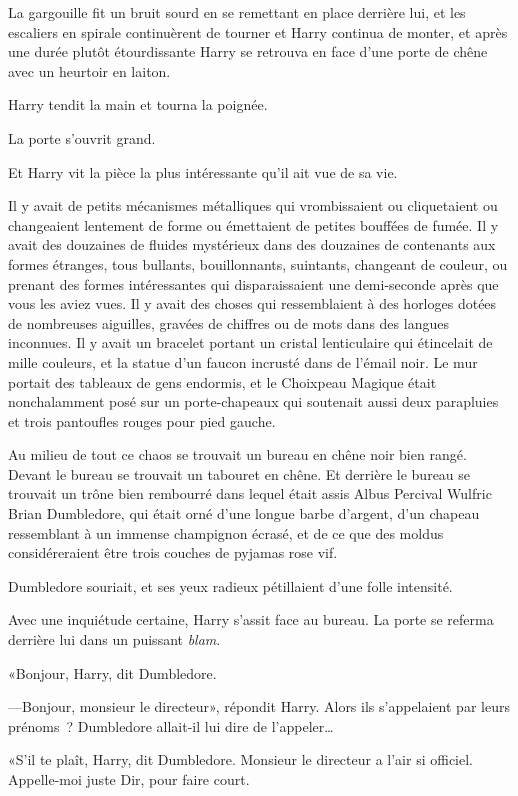 La gargouille fit un bruit sourd en se remettant en place derrière lui, et les escaliers en spirale continuèrent de tourner et Harry continua de monter, et après une durée plutôt étourdissante Harry se retrouva en face d'une porte de chêne avec un heurtoir en laiton.

Harry tendit la main et tourna la poignée.

La porte s'ouvrit grand.

Et Harry vit la pièce la plus intéressante qu'il ait vue de sa vie.

Il y avait de petits mécanismes métalliques qui vrombissaient ou cliquetaient ou changeaient lentement de forme ou émettaient de petites bouffées de fumée. Il y avait des douzaines de fluides mystérieux dans des douzaines de contenants aux formes étranges, tous bullants, bouillonnants, suintants, changeant de couleur, ou prenant des formes intéressantes qui disparaissaient une demi-seconde après que vous les aviez vues. Il y avait des choses qui ressemblaient à des horloges dotées de nombreuses aiguilles, gravées de chiffres ou de mots dans des langues inconnues. Il y avait un bracelet portant un cristal lenticulaire qui étincelait de mille couleurs, et la statue d'un faucon incrusté dans de l'émail noir. Le mur portait des tableaux de gens endormis, et le Choixpeau Magique était nonchalamment posé sur un porte-chapeaux qui soutenait aussi deux parapluies et trois pantoufles rouges pour pied gauche.

Au milieu de tout ce chaos se trouvait un bureau en chêne noir bien rangé. Devant le bureau se trouvait un tabouret en chêne. Et derrière le bureau se trouvait un trône bien rembourré dans lequel était assis Albus Percival Wulfric Brian Dumbledore, qui était orné d'une longue barbe d'argent, d'un chapeau ressemblant à un immense champignon écrasé, et de ce que des moldus considéreraient être trois couches de pyjamas rose vif.

Dumbledore souriait, et ses yeux radieux pétillaient d'une folle intensité.

Avec une inquiétude certaine, Harry s'assit face au bureau. La porte se referma derrière lui dans un puissant \emph{blam}.

«Bonjour, Harry, dit Dumbledore.

---Bonjour, monsieur le directeur», répondit Harry. Alors ils s'appelaient par leurs prénoms~? Dumbledore allait-il lui dire de l'appeler…

«S'il te plaît, Harry, dit Dumbledore. Monsieur le directeur a l'air si officiel. Appelle-moi juste Dir, pour faire court.

